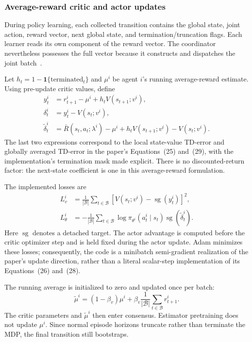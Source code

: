 \documentclass[11pt,a4paper]{article}
\newcommand{\stopgrad}{\operatorname{sg}}
\begin{document}
\subsubsection{Average-reward critic and actor updates}

During policy learning, each collected transition contains the global state,
joint action, reward vector, next global state, and termination/truncation
flags. Each learner reads its own component of the reward vector. The
coordinator nevertheless possesses the full vector because it constructs and
dispatches the joint batch~\cite{code-learning,code-workers}.

Let $h_t=1-\mathbf{1}\{\mathrm{terminated}_t\}$ and $\mu^i$ be agent $i$'s
running average-reward estimate. Using pre-update critic values, define
\begin{align}
 y_t^i &= r_{t+1}^i-\mu^i+h_tV(s_{t+1};v^i),\\
 \delta_t^i &= y_t^i-V(s_t;v^i),\\
 \widetilde\delta_t^i &= \bar R(s_t,a_t;\lambda^i)-\mu^i
             +h_tV(s_{t+1};v^i)-V(s_t;v^i).
 \label{eq:td}
\end{align}
The last two expressions correspond to the local state-value TD-error and
globally averaged TD-error in the paper's Equations~(25) and~(29), with the
implementation's termination mask made explicit. There is no discounted-return
factor: the next-state coefficient is one in this average-reward formulation.

The implemented losses are
\begin{align}
 L_v^i &= \frac{1}{|\mathcal B|}\sum_{t\in\mathcal B}
       \left[V(s_t;v^i)-\stopgrad(y_t^i)\right]^2,\\
 L_\theta^i &= -\frac{1}{|\mathcal B|}\sum_{t\in\mathcal B}
       \log\pi_{\theta^i}(a_t^i\mid s_t)
       \stopgrad(\widetilde\delta_t^i).
 \label{eq:ac-losses}
\end{align}
Here $\stopgrad$ denotes a detached target. The actor advantage is computed
before the critic optimizer step and is held fixed during the actor update.
Adam minimizes these losses; consequently, the code is a minibatch
semi-gradient realization of the paper's update direction, rather than a
literal scalar-step implementation of its Equations~(26) and~(28).

The running average is initialized to zero and updated once per batch:
\begin{equation}
 \widetilde\mu^i=(1-\beta_v)\mu^i+
       \beta_v\frac{1}{|\mathcal B|}\sum_{t\in\mathcal B}r_{t+1}^i.
 \label{eq:mu}
\end{equation}
The critic parameters and $\widetilde\mu^i$ then enter consensus. Estimator
pretraining does not update $\mu^i$. Since normal episode horizons truncate
rather than terminate the MDP, the final transition still bootstraps.
\end{document}
